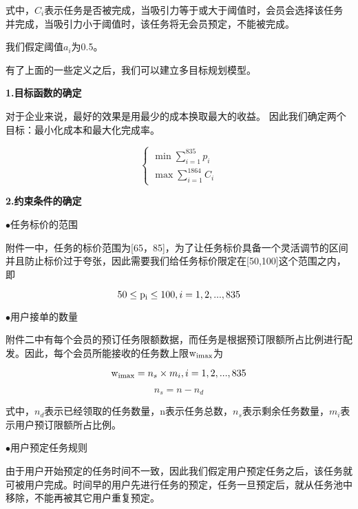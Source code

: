 \documentclass[withoutpreface,bwprint]{cumcmthesis} %
\begin{document}
式中，${C_i}$表示任务是否被完成，当吸引力等于或大于阈值时，会员会选择该任务并完成，当吸引力小于阈值时，该任务将无会员预定，不能被完成。

我们假定阈值${a_i}$为0.5。

有了上面的一些定义之后，我们可以建立多目标规划模型。

\textbf{1.目标函数的确定}

对于企业来说，最好的效果是用最少的成本换取最大的收益。
因此我们确定两个目标：最小化成本和最大化完成率。

\begin{equation}
\left\{ \begin{array}{l}
\min \sum\limits_{i = 1}^{835} {{p_i}} \\
\max \sum\limits_{i = 1}^{1864} {{C_i}} 
\end{array} \right.
\end{equation}

\textbf{2.约束条件的确定}

$\bullet$任务标价的范围

附件一中，任务的标价范围为[65，85]，为了让任务标价具备一个灵活调节的区间并且防止标价过于夸张，因此需要我们给任务标价限定在[50,100]这个范围之内，即

\begin{equation}
{\rm{50}} \le {\rm{p}}{}_{\rm{i}} \le 100,i = 1,2,...,835
\end{equation}

$\bullet$用户接单的数量

附件二中有每个会员的预订任务限额数据，而任务是根据预订限额所占比例进行配发。因此，每个会员所能接收的任务数上限${{\rm{w}}_{{\rm{imax}}}}$为

\begin{equation}
{{\rm{w}}_{{\rm{imax}}}} = {n_s} \times {m_i},i = 1,2,...,835
\end{equation}

\begin{equation}
{n_s} = n - {n_d}
\end{equation}

式中，${n_d}$表示已经领取的任务数量，n表示任务总数，${n_s}$表示剩余任务数量，${m_i}$表示用户预订限额所占比例。

$\bullet$用户预定任务规则

由于用户开始预定的任务时间不一致，因此我们假定用户预定任务之后，该任务就可被用户完成。时间早的用户先进行任务的预定，任务一旦预定后，就从任务池中移除，不能再被其它用户重复预定。
\end{document}
